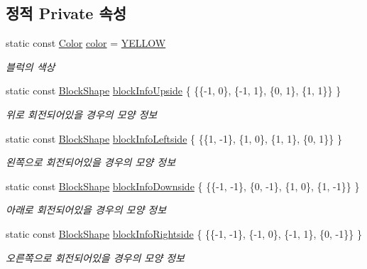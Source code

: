 \subsection*{정적 Private 속성}
\begin{DoxyCompactItemize}
\item 
static const \mbox{\hyperlink{class_block_ad054b4ac51df79aa910040b2a2fdf7b5}{Color}} \mbox{\hyperlink{class_j_adf3d9ba6faa25890b274cba9eabf02e5}{color}} = \mbox{\hyperlink{class_block_ad054b4ac51df79aa910040b2a2fdf7b5a7ae21b7c7ed4cd37d641a5119d0b3939}{Y\+E\+L\+L\+OW}}
\begin{DoxyCompactList}\small\item\em 블럭의 색상 \end{DoxyCompactList}\item 
static const \mbox{\hyperlink{class_block_aca5d951639f113e2ebd7856209d6b9ab}{Block\+Shape}} \mbox{\hyperlink{class_j_ab2d6ad0a92ed645027ee423bb4ff660b}{block\+Info\+Upside}} \{ \{\{-\/1, 0\}, \{-\/1, 1\}, \{0, 1\}, \{1, 1\}\} \}
\begin{DoxyCompactList}\small\item\em 위로 회전되어있을 경우의 모양 정보 \end{DoxyCompactList}\item 
static const \mbox{\hyperlink{class_block_aca5d951639f113e2ebd7856209d6b9ab}{Block\+Shape}} \mbox{\hyperlink{class_j_a3772ed06ecd269c9bb646acb32ba1e57}{block\+Info\+Leftside}} \{ \{\{1, -\/1\}, \{1, 0\}, \{1, 1\}, \{0, 1\}\} \}
\begin{DoxyCompactList}\small\item\em 왼쪽으로 회전되어있을 경우의 모양 정보 \end{DoxyCompactList}\item 
static const \mbox{\hyperlink{class_block_aca5d951639f113e2ebd7856209d6b9ab}{Block\+Shape}} \mbox{\hyperlink{class_j_a8729720907e14a70874f8daa0b3f2971}{block\+Info\+Downside}} \{ \{\{-\/1, -\/1\}, \{0, -\/1\}, \{1, 0\}, \{1, -\/1\}\} \}
\begin{DoxyCompactList}\small\item\em 아래로 회전되어있을 경우의 모양 정보 \end{DoxyCompactList}\item 
static const \mbox{\hyperlink{class_block_aca5d951639f113e2ebd7856209d6b9ab}{Block\+Shape}} \mbox{\hyperlink{class_j_a412d1f5ebc3078b09d5568c16c741a25}{block\+Info\+Rightside}} \{ \{\{-\/1, -\/1\}, \{-\/1, 0\}, \{-\/1, 1\}, \{0, -\/1\}\} \}
\begin{DoxyCompactList}\small\item\em 오른쪽으로 회전되어있을 경우의 모양 정보 \end{DoxyCompactList}\end{DoxyCompactItemize}


